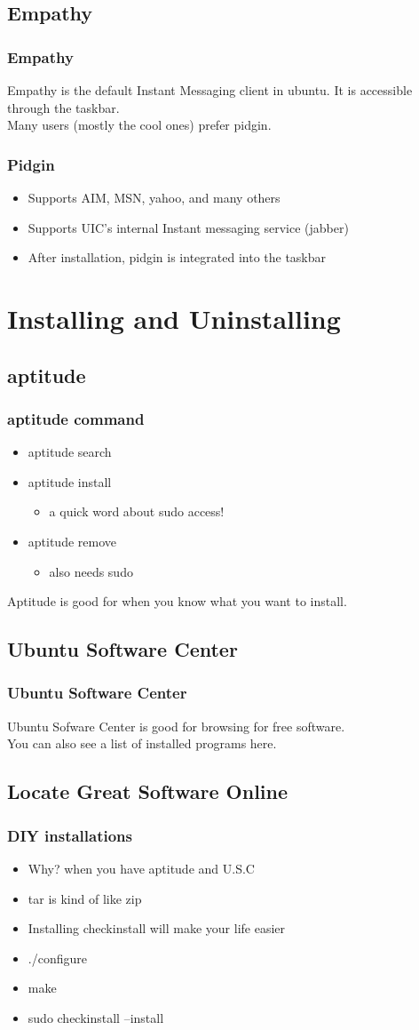 \documentclass[hyperref={pdfpagelabels=false}]{beamer}
\begin{document}
\subsection{Empathy}
\frame
{
	\frametitle{Empathy}
	Empathy is the default Instant Messaging client in ubuntu. It is accessible through the taskbar. \\
        Many users (mostly the cool ones) prefer pidgin.
}
\frame
{
	\frametitle{Pidgin}
	\begin{itemize}
	\item{Supports AIM, MSN, yahoo, and many others}
	\item{Supports UIC's internal Instant messaging service (jabber)}
	\item{After installation, pidgin is integrated into the taskbar}
	\end{itemize}
}
\section{Installing and Uninstalling}
\subsection{aptitude}
\frame
{
	\frametitle{aptitude command}
	\begin{itemize}
	\item{aptitude search}
	\item{aptitude install}
		\begin{itemize}
		\item{a quick word about sudo access!}
		\end{itemize}
	\item{aptitude remove}
		\begin{itemize}
		\item{also needs sudo}
		\end{itemize}
	\end{itemize}
	Aptitude is good for when you know what you want to install.	
	
}
\subsection{Ubuntu Software Center}
\frame
{
	\frametitle{Ubuntu Software Center}
	Ubuntu Sofware Center is good for browsing for free software. \\
	You can also see a list of installed programs here.

}
\subsection{Locate Great Software Online}
\frame
{	
	\frametitle{DIY installations}
	\begin{itemize}
	\item{Why? when you have aptitude and U.S.C}
	\item{tar is kind of like zip}
	\item{Installing checkinstall will make your life easier}
	\item{./configure}
	\item{make}
	\item{sudo checkinstall --install}
	\end{itemize}

}
\end{document}

